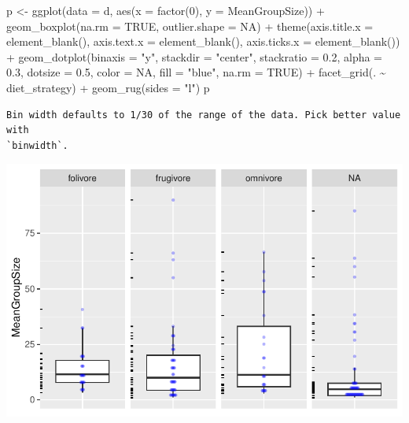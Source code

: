 \documentclass[
  letterpaper,
  DIV=11,
  numbers=noendperiod]{scrartcl}
\newenvironment{Shaded}{\begin{snugshade}}{\end{snugshade}}
\newcommand{\AttributeTok}[1]{\textcolor[rgb]{0.40,0.45,0.13}{#1}}
\newcommand{\ConstantTok}[1]{\textcolor[rgb]{0.56,0.35,0.01}{#1}}
\newcommand{\DecValTok}[1]{\textcolor[rgb]{0.68,0.00,0.00}{#1}}
\newcommand{\FloatTok}[1]{\textcolor[rgb]{0.68,0.00,0.00}{#1}}
\newcommand{\FunctionTok}[1]{\textcolor[rgb]{0.28,0.35,0.67}{#1}}
\newcommand{\NormalTok}[1]{\textcolor[rgb]{0.00,0.23,0.31}{#1}}
\newcommand{\OtherTok}[1]{\textcolor[rgb]{0.00,0.23,0.31}{#1}}
\newcommand{\SpecialCharTok}[1]{\textcolor[rgb]{0.37,0.37,0.37}{#1}}
\newcommand{\StringTok}[1]{\textcolor[rgb]{0.13,0.47,0.30}{#1}}
\begin{document}
\begin{Shaded}
\begin{Highlighting}[]
\NormalTok{p }\OtherTok{\textless{}{-}} \FunctionTok{ggplot}\NormalTok{(}\AttributeTok{data =}\NormalTok{ d, }
            \FunctionTok{aes}\NormalTok{(}\AttributeTok{x =} \FunctionTok{factor}\NormalTok{(}\DecValTok{0}\NormalTok{), }\AttributeTok{y =}\NormalTok{ MeanGroupSize)) }\SpecialCharTok{+} 
  \FunctionTok{geom\_boxplot}\NormalTok{(}\AttributeTok{na.rm =} \ConstantTok{TRUE}\NormalTok{, }\AttributeTok{outlier.shape =} \ConstantTok{NA}\NormalTok{) }\SpecialCharTok{+} 
  \FunctionTok{theme}\NormalTok{(}\AttributeTok{axis.title.x =} \FunctionTok{element\_blank}\NormalTok{(), }
        \AttributeTok{axis.text.x =} \FunctionTok{element\_blank}\NormalTok{(), }
        \AttributeTok{axis.ticks.x =} \FunctionTok{element\_blank}\NormalTok{()) }\SpecialCharTok{+} 
  \FunctionTok{geom\_dotplot}\NormalTok{(}\AttributeTok{binaxis =} \StringTok{"y"}\NormalTok{, }\AttributeTok{stackdir =} \StringTok{"center"}\NormalTok{, }
               \AttributeTok{stackratio =} \FloatTok{0.2}\NormalTok{, }\AttributeTok{alpha =} \FloatTok{0.3}\NormalTok{, }\AttributeTok{dotsize =} \FloatTok{0.5}\NormalTok{, }\AttributeTok{color =} \ConstantTok{NA}\NormalTok{, }
               \AttributeTok{fill =} \StringTok{"blue"}\NormalTok{, }\AttributeTok{na.rm =} \ConstantTok{TRUE}\NormalTok{) }\SpecialCharTok{+}
  \FunctionTok{facet\_grid}\NormalTok{(. }\SpecialCharTok{\textasciitilde{}}\NormalTok{ diet\_strategy) }\SpecialCharTok{+} \FunctionTok{geom\_rug}\NormalTok{(}\AttributeTok{sides =} \StringTok{"l"}\NormalTok{)}
\NormalTok{p}
\end{Highlighting}
\end{Shaded}

\begin{verbatim}
Bin width defaults to 1/30 of the range of the data. Pick better value with
`binwidth`.
\end{verbatim}

\includegraphics{EDA-challenge_files/figure-pdf/unnamed-chunk-7-1.pdf}
\end{document}

